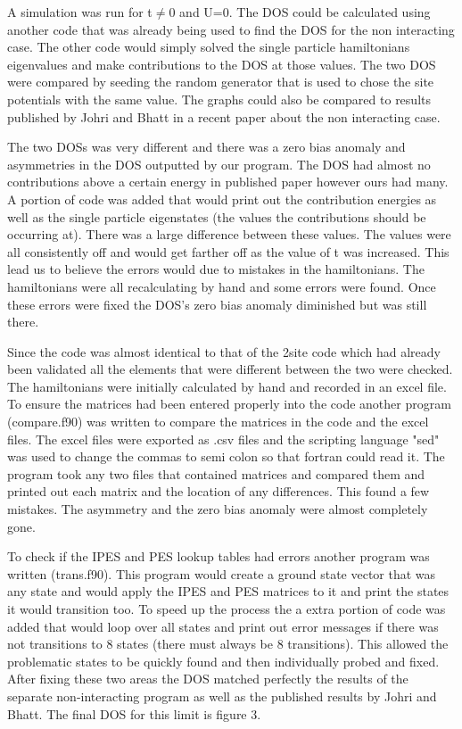 \documentclass{article}
\begin{document}
A simulation was run for t$\ne$0 and U=0. The DOS could be calculated using another code that was already being used to find the DOS for the non interacting case. The other code would simply solved the single particle hamiltonians eigenvalues and make contributions to the DOS at those values. The two DOS were compared by seeding the random generator that is used to chose the site potentials with the same value. The graphs could also be compared to results published by Johri and Bhatt in a recent paper about the non interacting case.

The two DOSs was very different and there was a zero bias anomaly and asymmetries in the DOS outputted by our program. The DOS had almost no contributions above a certain energy in published paper however ours had many. A portion of code was added that would print out the contribution energies as well as the single particle eigenstates (the values the contributions should be occurring at). There was a large difference between these values. The values were all consistently off and would get farther off as the value of t was increased. This lead us to believe the errors would due to mistakes in the hamiltonians. The hamiltonians were all recalculating by hand and some errors were found. Once these errors were fixed the DOS's zero bias anomaly diminished but was still there.

Since the code was almost identical to that of the 2site code which had already been validated all the elements that were different between the two were checked. The hamiltonians were initially calculated by hand and recorded in an excel file. To ensure the matrices had been entered properly into the code another program (compare.f90) was written to compare the matrices in the code and the excel files. The excel files were exported as .csv files and the scripting language "sed" was used to change the commas to semi colon so that fortran could read it. The program took any two files that contained matrices and compared them and printed out each matrix and the location of any differences. This found a few mistakes. The asymmetry and the zero bias anomaly were almost completely gone.

To check if the IPES and PES lookup tables had errors another program was written (trans.f90). This program would create a ground state vector that was any state and would apply the IPES and PES matrices to it and print the states it would transition too. To speed up the process the a extra portion of code was added that would loop over all states and print out error messages if there was not transitions to 8 states (there must always be 8 transitions). This allowed the problematic states to be quickly found and then individually probed and fixed. After fixing these two areas the DOS matched perfectly the results of the separate non-interacting program as well as the published results by Johri and Bhatt. The final DOS for this limit is figure 3.
\end{document}
